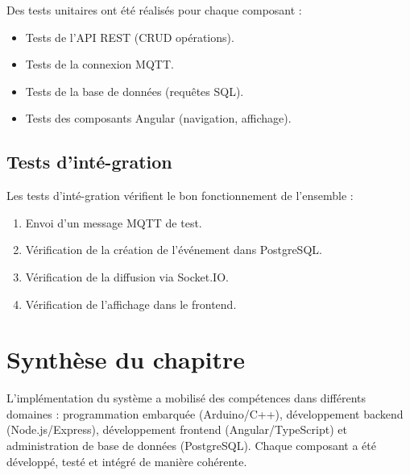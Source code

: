 Des tests unitaires ont \'et\'e r\'ealis\'es pour chaque composant :

\begin{itemize}
    \item Tests de l'API REST (CRUD op\'erations).
    \item Tests de la connexion MQTT.
    \item Tests de la base de donn\'ees (requ\^etes SQL).
    \item Tests des composants Angular (navigation, affichage).
\end{itemize}

\subsection{Tests d'int\'e-gration}

Les tests d'int\'e-gration v\'erifient le bon fonctionnement de l'ensemble :

\begin{enumerate}
    \item Envoi d'un message MQTT de test.
    \item V\'erification de la cr\'eation de l'\'ev\'enement dans PostgreSQL.
    \item V\'erification de la diffusion via Socket.IO.
    \item V\'erification de l'affichage dans le frontend.
\end{enumerate}

\section{Synth\`ese du chapitre}

L'impl\'ementation du syst\`eme a mobilis\'e des comp\'etences dans diff\'erents domaines : programmation embarqu\'ee (Arduino/C++), d\'eveloppement backend (Node.js/Express), d\'eveloppement frontend (Angular/TypeScript) et administration de base de donn\'ees (PostgreSQL). Chaque composant a \'et\'e d\'evelopp\'e, test\'e et int\'egr\'e de mani\`ere coh\'erente.
